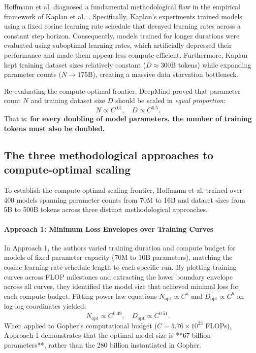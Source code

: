 \documentclass[../../../main.tex]{subfiles}
\begin{document}
Hoffmann et al. diagnosed a fundamental methodological flaw in the empirical framework of Kaplan et al.~\cite{kaplan2020}. Specifically, Kaplan's experiments trained models using a fixed cosine learning rate schedule that decayed learning rates across a constant step horizon. Consequently, models trained for longer durations were evaluated using suboptimal learning rates, which artificially depressed their performance and made them appear less compute-efficient. Furthermore, Kaplan kept training dataset sizes relatively constant ($D \approx 300\text{B}$ tokens) while expanding parameter counts ($N \to 175\text{B}$), creating a massive data starvation bottleneck.

Re-evaluating the compute-optimal frontier, DeepMind proved that parameter count $N$ and training dataset size $D$ should be scaled in \emph{equal proportion}:
\begin{equation}
N \propto C^{0.5}, \quad D \propto C^{0.5}.
\label{eq:chinchilla_balanced_scaling}
\end{equation}
That is: \textbf{for every doubling of model parameters, the number of training tokens must also be doubled.}


\subsection{The three methodological approaches to compute-optimal scaling}
\label{subsec:chinchilla_three_approaches}

To establish the compute-optimal scaling frontier, Hoffmann et al. trained over 400 models spanning parameter counts from 70M to 16B and dataset sizes from 5B to 500B tokens across three distinct methodological approaches.

\paragraph{Approach 1: Minimum Loss Envelopes over Training Curves}
In Approach 1, the authors varied training duration and compute budget for models of fixed parameter capacity ($70\text{M}$ to $10\text{B}$ parameters), matching the cosine learning rate schedule length to each specific run. By plotting training curves across FLOP milestones and extracting the lower boundary envelope across all curves, they identified the model size that achieved minimal loss for each compute budget. Fitting power-law equations $N_{\text{opt}} \propto C^a$ and $D_{\text{opt}} \propto C^b$ on log-log coordinates yielded:
\begin{equation}
N_{\text{opt}} \propto C^{0.49}, \quad D_{\text{opt}} \propto C^{0.51}.
\label{eq:chinchilla_approach1_exponents}
\end{equation}
When applied to Gopher's computational budget ($C = 5.76 \times 10^{23}$ FLOPs), Approach 1 demonstrates that the optimal model size is **67 billion parameters**, rather than the 280 billion instantiated in Gopher.
\end{document}
